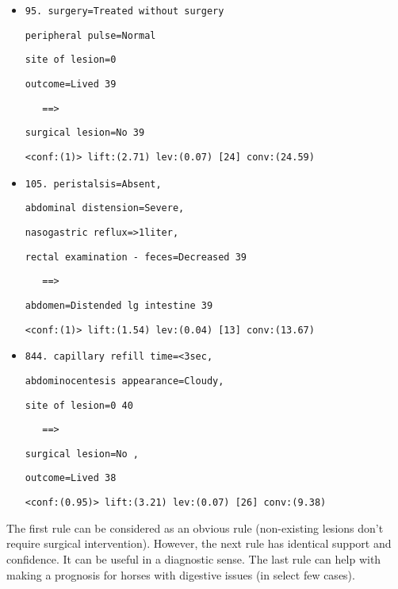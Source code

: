 \begin{itemize}

\item \verb|95. surgery=Treated without surgery |

\verb|peripheral pulse=Normal| 

\verb|site of lesion=0| 

\verb|outcome=Lived 39| 

\verb|   ==>|

\verb|surgical lesion=No 39|

\verb|<conf:(1)> lift:(2.71) lev:(0.07) [24] conv:(24.59)|


\item \verb|105. peristalsis=Absent,|

\verb|abdominal distension=Severe,|

\verb|nasogastric reflux=>1liter,|

\verb|rectal examination - feces=Decreased 39|

\verb|   ==>|

\verb|abdomen=Distended lg intestine 39|

\verb|<conf:(1)> lift:(1.54) lev:(0.04) [13] conv:(13.67)|


\item \verb|844. capillary refill time=<3sec,|

\verb|abdominocentesis appearance=Cloudy,|

\verb|site of lesion=0 40| 

\verb|   ==>|

\verb|surgical lesion=No ,|

\verb|outcome=Lived 38|

\verb|<conf:(0.95)> lift:(3.21) lev:(0.07) [26] conv:(9.38)|
\end{itemize}
%
The first rule can be considered as an obvious rule (non-existing lesions don't require surgical intervention).
However, the next rule has identical support and confidence. It can be useful in a diagnostic sense.
The last rule can help with making a prognosis for horses with digestive issues (in select few cases).


